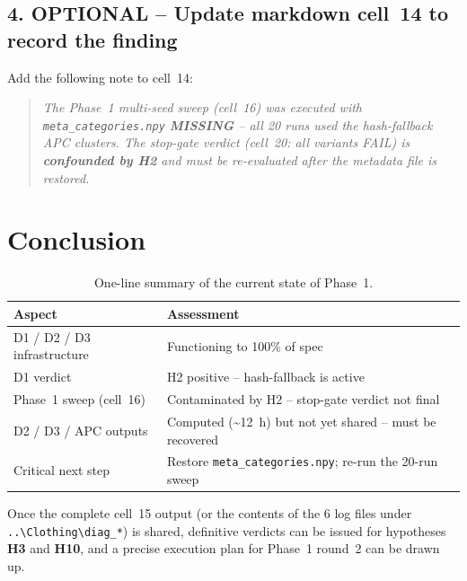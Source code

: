 \documentclass[11pt,a4paper]{article}
\begin{document}
\subsection*{4. OPTIONAL -- Update markdown cell~14 to record the finding}

Add the following note to cell~14:

\begin{quote}\itshape
The Phase~1 multi-seed sweep (cell~16) was executed with
\texttt{meta\_categories.npy} \textbf{MISSING} -- all 20 runs used the
hash-fallback APC clusters. The stop-gate verdict (cell~20: all variants
FAIL) is \textbf{confounded by H2} and must be re-evaluated after the
metadata file is restored.
\end{quote}

\section{Conclusion}

\begin{table}[h]
\centering
\renewcommand{\arraystretch}{1.3}
\begin{tabularx}{\textwidth}{|l|X|}
\hline
\textbf{Aspect} & \textbf{Assessment} \\
\hline
D1 / D2 / D3 infrastructure & Functioning to 100\% of spec \\
\hline
D1 verdict & H2 positive -- hash-fallback is active \\
\hline
Phase~1 sweep (cell~16) & Contaminated by H2 -- stop-gate verdict not final \\
\hline
D2 / D3 / APC outputs & Computed (\textasciitilde 12~h) but not yet shared -- must be recovered \\
\hline
Critical next step & Restore \texttt{meta\_categories.npy}; re-run the 20-run sweep \\
\hline
\end{tabularx}
\caption{One-line summary of the current state of Phase~1.}
\label{tab:summary}
\end{table}

\noindent Once the complete cell~15 output (or the contents of the 6 log
files under \verb|..\Clothing\diag_*|) is shared, definitive verdicts can be
issued for hypotheses \textbf{H3} and \textbf{H10}, and a precise execution
plan for Phase~1 round~2 can be drawn up.
\end{document}
